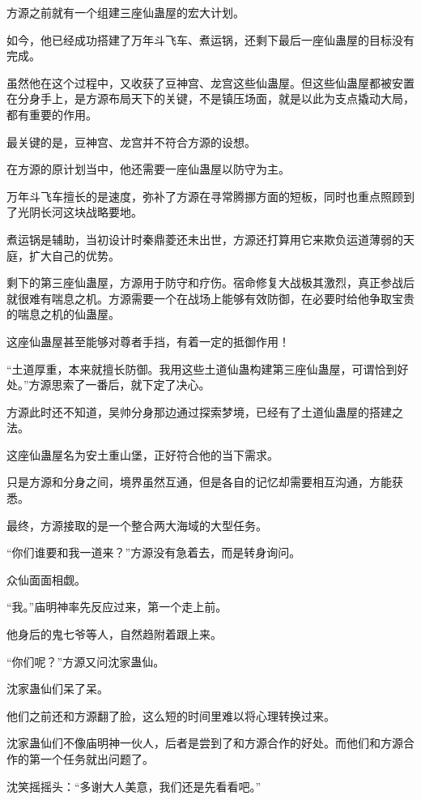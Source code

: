 
\begin{this_body}

方源之前就有一个组建三座仙蛊屋的宏大计划。

如今，他已经成功搭建了万年斗飞车、煮运锅，还剩下最后一座仙蛊屋的目标没有完成。

虽然他在这个过程中，又收获了豆神宫、龙宫这些仙蛊屋。但这些仙蛊屋都被安置在分身手上，是方源布局天下的关键，不是镇压场面，就是以此为支点撬动大局，都有重要的作用。

最关键的是，豆神宫、龙宫并不符合方源的设想。

在方源的原计划当中，他还需要一座仙蛊屋以防守为主。

万年斗飞车擅长的是速度，弥补了方源在寻常腾挪方面的短板，同时也重点照顾到了光阴长河这块战略要地。

煮运锅是辅助，当初设计时秦鼎菱还未出世，方源还打算用它来欺负运道薄弱的天庭，扩大自己的优势。

剩下的第三座仙蛊屋，方源用于防守和疗伤。宿命修复大战极其激烈，真正参战后就很难有喘息之机。方源需要一个在战场上能够有效防御，在必要时给他争取宝贵的喘息之机的仙蛊屋。

这座仙蛊屋甚至能够对尊者手挡，有着一定的抵御作用！

“土道厚重，本来就擅长防御。我用这些土道仙蛊构建第三座仙蛊屋，可谓恰到好处。”方源思索了一番后，就下定了决心。

方源此时还不知道，吴帅分身那边通过探索梦境，已经有了土道仙蛊屋的搭建之法。

这座仙蛊屋名为安土重山堡，正好符合他的当下需求。

只是方源和分身之间，境界虽然互通，但是各自的记忆却需要相互沟通，方能获悉。

最终，方源接取的是一个整合两大海域的大型任务。

“你们谁要和我一道来？”方源没有急着去，而是转身询问。

众仙面面相觑。

“我。”庙明神率先反应过来，第一个走上前。

他身后的鬼七爷等人，自然趋附着跟上来。

“你们呢？”方源又问沈家蛊仙。

沈家蛊仙们呆了呆。

他们之前还和方源翻了脸，这么短的时间里难以将心理转换过来。

沈家蛊仙们不像庙明神一伙人，后者是尝到了和方源合作的好处。而他们和方源合作的第一个任务就出问题了。

沈笑摇摇头：“多谢大人美意，我们还是先看看吧。”


\end{this_body}
